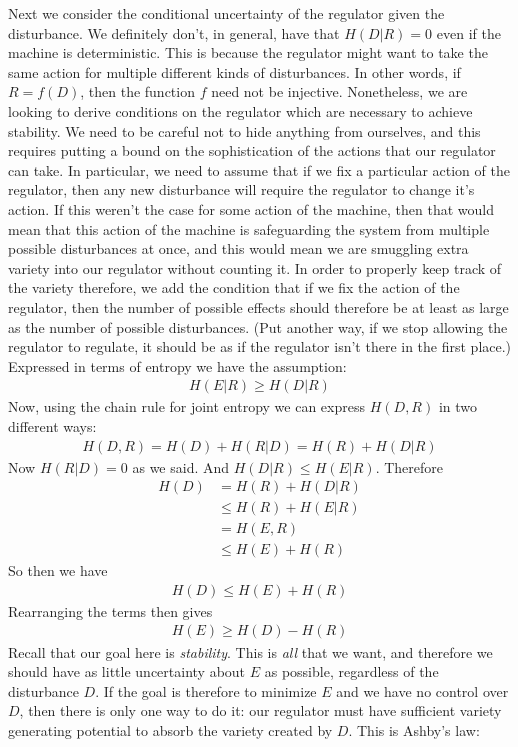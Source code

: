 Next we consider the conditional uncertainty of the regulator given the disturbance. We definitely don't, in general, have that $H(D|R) = 0$ even if the machine is deterministic. This is because the regulator might want to take the same action for multiple different kinds of disturbances. In other words, if $R = f(D)$, then the function $f$ need not be injective. Nonetheless, we are looking to derive conditions on the regulator which are necessary to achieve stability. We need to be careful not to hide anything from ourselves, and this requires putting a bound on the sophistication of the actions that our regulator can take. In particular, we need to assume that if we fix a particular action of the regulator, then any new disturbance will require the regulator to change it's action. If this weren't the case for some action of the machine, then that would mean that this action of the machine is safeguarding the system from multiple possible disturbances at once, and this would mean we are smuggling extra variety into our regulator without counting it. In order to properly keep track of the variety therefore, we add the condition that if we fix the action of the regulator, then the number of possible effects should therefore be at least as large as the number of possible disturbances. (Put another way, if we stop allowing the regulator to regulate, it should be as if the regulator isn't there in the first place.) Expressed in terms of entropy we have the assumption:
 \begin{align}
	H(E|R) \geq H(D|R)
\end{align}
Now, using the chain rule for joint entropy we can express $H(D,R)$ in two different ways:
\begin{align}
	H(D,R) = H(D)+H(R|D) = H(R)+H(D|R)
\end{align}
Now $H(R|D) = 0$ as we said. And $H(D|R) \leq H(E|R)$. Therefore
\begin{align}
	H(D) &= H(R)+H(D|R) \\ &\leq H(R)+H(E|R) \\ &= H(E,R) \\ &\leq H(E)+H(R)
\end{align}
So then we have 
\begin{align}
	H(D) \leq H(E)+H(R)
\end{align}
Rearranging the terms then gives 
\begin{align}
	H(E) \geq H(D)-H(R)
\end{align}
Recall that our goal here is \emph{stability}. This is \emph{all} that we want, and therefore we should have as little uncertainty about $E$ as possible, regardless of the disturbance $D$. If the goal is therefore to minimize $E$ and we have no control over $D$, then there is only one way to do it: our regulator must have sufficient variety generating potential to absorb the variety created by $D$. This is Ashby's law:
